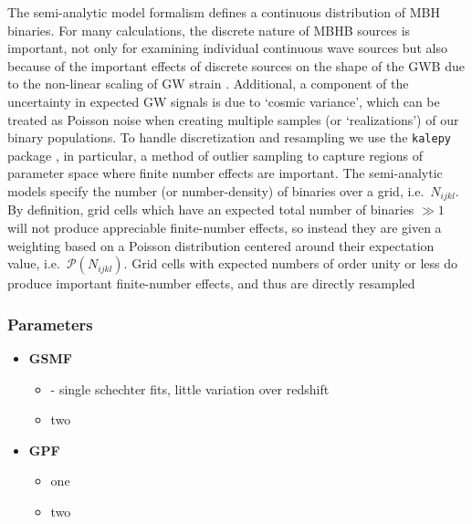\documentclass[useAMS, usenatbib]{mnras}
\begin{document}
        The semi-analytic model formalism defines a continuous distribution of MBH binaries.  For many calculations, the discrete nature of MBHB sources is important, not only for examining individual continuous wave sources but also because of the important effects of discrete sources on the shape of the GWB due to the non-linear scaling of GW strain \citep{Sesana+2008}.  Additional, a component of the uncertainty in expected GW signals is due to `cosmic variance', which can be treated as Poisson noise when creating multiple samples (or `realizations') of our binary populations.  To handle discretization and resampling we use the \texttt{kalepy} package \citep{kalepy2021}, in particular, a method of outlier sampling to capture regions of parameter space where finite number effects are important.  The \holodeck{} semi-analytic models specify the number (or number-density) of binaries over a grid, i.e.~$N_{ijkl}$.  By definition, grid cells which have an expected total number of binaries $\gg 1$ will not produce appreciable finite-number effects, so instead they are given a weighting based on a Poisson distribution centered around their expectation value, i.e.~$\mathcal{P}(N_{ijkl})$.  Grid cells with expected numbers of order unity or less do produce important finite-number effects, and thus are directly resampled

        \subsubsection{Parameters}

            \begin{itemize}
                \item \textbf{GSMF}
                \begin{itemize}
                    \item \citep{Tomczak+2014} - single schechter fits, little variation over redshift\\
                    \item two
                \end{itemize}


                \item \textbf{GPF}
                \begin{itemize}
                    \item one \\
                    \item two
                \end{itemize}


            \end{itemize}
\end{document}
